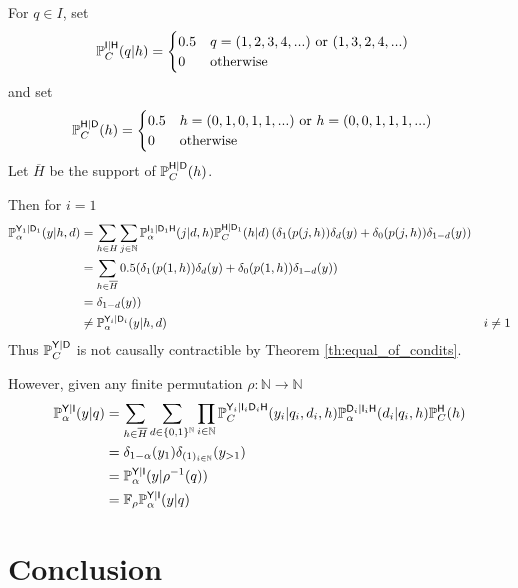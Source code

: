 \begin{example}
For $q\in I$, set
\begin{align}
    \mathbb{P}_C^{\mathsf{I}|\mathsf{H}}(q|h)&= \begin{cases}
        0.5 & q=(1,2,3,4,...) \text{ or } (1,3,2,4,...)\\
        0&\text{otherwise}
    \end{cases}
\end{align}
and set
\begin{align}
    \mathbb{P}_C^{\mathsf{H}|\mathsf{D}}(h) &= \begin{cases}
        0.5 & h=(0,1,0,1,1,...)\text{ or }h=(0,0,1,1,1,...)\\
        0 &\text{otherwise}
    \end{cases}
\end{align}
Let $\overline{H}$ be the support of $\mathbb{P}_C^{\mathsf{H}|\mathsf{D}}(h)$.

Then for $i=1$
\begin{align}
    \mathbb{P}_\alpha^{\mathsf{Y}_1|\mathsf{D}_1}(y|h,d) &= \sum_{h\in H} \sum_{j\in \mathbb{N}} \mathbb{P}_\alpha^{\mathsf{I}_1|\mathsf{D}_1\mathsf{H}}(j|d,h)\mathbb{P}_C^{\mathsf{H}|\mathsf{D}_1}(h|d)\left(\delta_1(p(j,h))\delta_d(y) + \delta_0(p(j,h))\delta_{1-d}(y)\right)\\
    &= \sum_{h\in \overline{H}} 0.5( \delta_1(p(1,h))\delta_d(y) + \delta_0(p(1,h))\delta_{1-d}(y))\\
    &= \delta_{1-d}(y))\\
    &\neq  \mathbb{P}_\alpha^{\mathsf{Y}_i|\mathsf{D}_i}(y|h,d) & i\neq 1
\end{align}
Thus $\mathbb{P}_C^{\mathsf{Y}|\mathsf{D}}$ is not causally contractible by Theorem \ref{th:equal_of_condits}. 

However, given any finite permutation $\rho:\mathbb{N}\to\mathbb{N}$
\begin{align}
    \mathbb{P}_\alpha^{\mathsf{Y}|\mathsf{I}}(y|q) &= \sum_{h\in \overline{H}}\sum_{d\in\{0,1\}^{\mathbb{N}}} \prod_{i\in \mathbb{N}} \mathbb{P}_C^{\mathsf{Y}_i|\mathsf{I}_i\mathsf{D}_i\mathsf{H}}(y_i|q_i,d_i,h) \mathbb{P}_\alpha^{\mathsf{D}_i|\mathsf{I}_i\mathsf{H}}(d_i|q_i,h)\mathbb{P}_C^{\mathsf{H}}(h)\\
    &= \delta_{1-\alpha}(y_1)\delta_{(1)_{i\in\mathbb{N}}}(y_{>1})\\
    &= \mathbb{P}_\alpha^{\mathsf{Y}|\mathsf{I}}(y|\rho^{-1}(q))\\
    &= \mathbb{F}_{\rho}\mathbb{P}_\alpha^{\mathsf{Y}|\mathsf{I}}(y|q)
\end{align}
\end{example}


\section{Conclusion}

